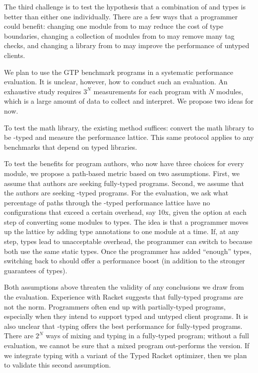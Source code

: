 The third challenge is to test the hypothesis that a combination of \tdeep{}
 and \tshallow{} types is better than either one individually.
There are a few ways that a programmer could benefit:
 changing one module from \tdeep{} to \tshallow{} may reduce the cost of type boundaries,
 changing a collection of modules from \tshallow{} to \tdeep{} may remove many tag checks,
 and changing a library from \tdeep{} to \tshallow{} may improve the performance of untyped clients.

We plan to use the GTP benchmark programs in a systematic performance evaluation.
It is unclear, however, how to conduct such an evaluation.
An exhaustive study requires $3^N$ measurements for each program with $N$
 modules, which is a large amount of data to collect and interpret.
We propose two ideas for now.

To test the math library, the existing method suffices:
 convert the math library to be \tshallow{}-typed and measure the performance lattice.
This same protocol applies to any benchmarks that depend on typed libraries.

To test the benefits for program authors, who now have three choices for every
module, we propose a path-based metric based on two assumptions.
First, we assume that authors are seeking fully-typed programs.
Second, we assume that the authors are seeking \tdeep{}-typed programs.
For the evaluation, we ask what percentage of paths through the \tdeep{}-typed performance
 lattice have no configurations that exceed a certain overhead, say 10x, given
 the option at each step of converting some modules to \tshallow{} types.
The idea is that a programmer moves up the lattice by adding type annotations
 to one module at a time.
If, at any step, \tdeep{} types lead to unacceptable overhead, the programmer can
 switch to \tshallow{} because both use the same static types.
Once the programmer has added ``enough'' types, switching back to \tdeep{} should
offer a performance boost (in addition to the stronger guarantees of \tdeep{} types).

Both assumptions above threaten the validity of any conclusions we draw from the
evaluation.
Experience with Racket suggests that fully-typed programs are not the norm.
Programmers often end up with partially-typed programs, especially when they
intend to support typed and untyped client programs.
It is also unclear that \tdeep{}-typing offers the best performance for fully-typed
programs.
There are $2^N$ ways of mixing \tdeep{} and \tshallow{} typing in a fully-typed program;
 without a full evaluation, we cannot be sure that a mixed program out-performs
 the \tdeep{} version.
If we integrate \tshallow{} typing with a variant of the Typed Racket optimizer,
then we plan to validate this second assumption.

